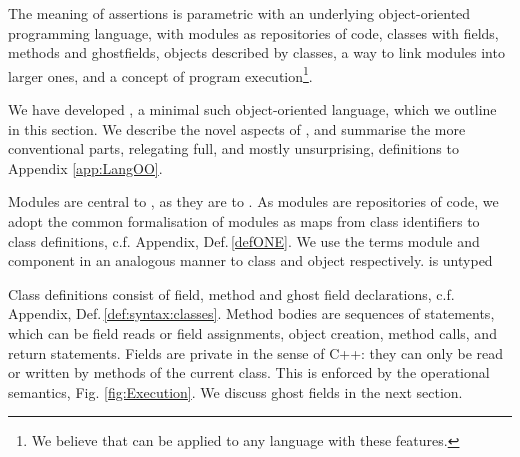 \renewcommand{\appref}[1]{, c.f. Appendix, Def.\,\ref{#1}}
 
The meaning of \Chainmail assertions is parametric with an
underlying object-oriented programming language, with modules  as repositories of code, classes with fields, methods and
ghostfields, objects described by classes, a way to link  modules into larger ones, and a concept of 
program execution\footnote{We believe that \Chainmail can be applied to 
any language with these features.}.

We have developed   \LangOO, a minimal such object-oriented language, which we
outline in  this section. 
We  describe the novel aspects of \LangOO, and 
summarise the more conventional parts, relegating  full, and mostly unsurprising,
definitions %
to Appendix \ref{app:LangOO}.
 

Modules are central to \LangOO, as they are to \Chainmail. As modules are repositories
of code, we adopt the common formalisation of modules as maps from 
class identifiers to class definitions\appref{defONE}. We use the terms module and component in an
analogous manner to class and object respectively.  \LangOO is untyped 

 Class
definitions consist of field, method and ghost field declarations\appref{def:syntax:classes}.
Method bodies are sequences of 
statements, which  can be field reads or field assignments, object
creation, method calls, and return statements. 
Fields are private in the sense of C++: they can only be read or
written by methods of the current class.
This is enforced by the operational semantics, \cf Fig.  \ref{fig:Execution}.
We  discuss ghost fields in the next section.

